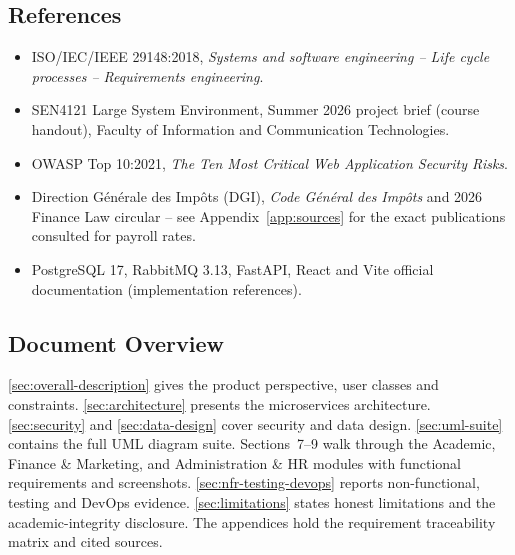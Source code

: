 \subsection{References}
\begin{itemize}[leftmargin=1.4em]
  \item ISO/IEC/IEEE 29148:2018, \textit{Systems and software engineering --
    Life cycle processes -- Requirements engineering}.
  \item SEN4121 Large System Environment, Summer 2026 project brief (course
    handout), Faculty of Information and Communication Technologies.
  \item OWASP Top 10:2021, \textit{The Ten Most Critical Web Application
    Security Risks}.
  \item Direction G\'en\'erale des Imp\^ots (DGI), \textit{Code G\'en\'eral des
    Imp\^ots} and 2026 Finance Law circular -- see Appendix~\ref{app:sources}
    for the exact publications consulted for payroll rates.
  \item PostgreSQL 17, RabbitMQ 3.13, FastAPI, React and Vite official
    documentation (implementation references).
\end{itemize}

\subsection{Document Overview}
\cref{sec:overall-description} gives the product perspective, user classes and
constraints. \cref{sec:architecture} presents the microservices architecture.
\cref{sec:security} and \cref{sec:data-design} cover security and data design.
\cref{sec:uml-suite} contains the full UML diagram suite. Sections~7--9 walk
through the Academic, Finance \& Marketing, and Administration \& HR modules
with functional requirements and screenshots. \cref{sec:nfr-testing-devops}
reports non-functional, testing and DevOps evidence. \cref{sec:limitations}
states honest limitations and the academic-integrity disclosure. The
appendices hold the requirement traceability matrix and cited sources.
